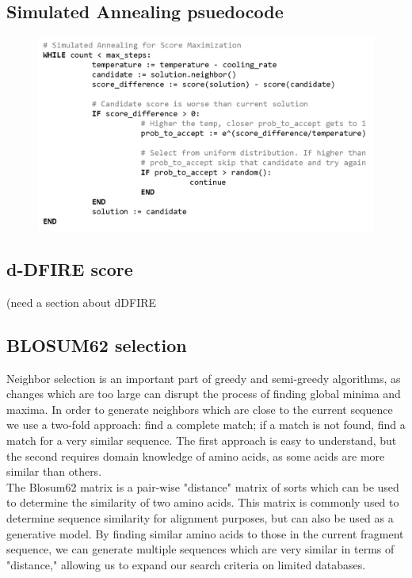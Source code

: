 \documentclass{article}
\begin{document}
\begin{enumerate}
\section{Simulated Annealing psuedocode}
\begin{figure}[H]
\begin{center}
\includegraphics[width=\textwidth]{sa}
\label{Fig:blosum}
\end{center}
\end{figure}

\subsection{d-DFIRE score}

(need a section about dDFIRE

\subsection{BLOSUM62 selection}

Neighbor selection is an important part of greedy and semi-greedy algorithms, as changes which are too large can disrupt the process of finding global minima and maxima. In order to generate neighbors which are close to the current sequence we use a two-fold approach: find a complete match; if a match is not found, find a match for a very similar sequence. The first approach is easy to understand, but the second requires domain knowledge of amino acids, as some acids are more similar than others.\\

The Blosum62 matrix is a pair-wise "distance" matrix of sorts which can be used to determine the similarity of two amino acids. This matrix is commonly used to determine sequence similarity for alignment purposes, but can also be used as a generative model. By finding similar amino acids to those in the current fragment sequence, we can generate multiple sequences which are very similar in terms of "distance," allowing us to expand our search criteria on limited databases.


\end{enumerate}
\end{document}

